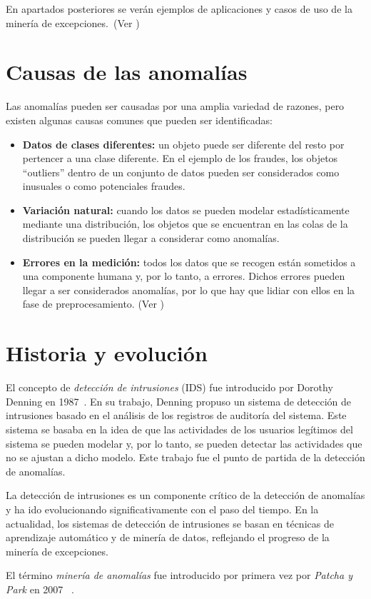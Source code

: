 En apartados posteriores se verán ejemplos de aplicaciones y casos de uso de la minería de
excepciones.~(Ver )

\section{Causas de las anomalías}
Las anomalías pueden ser causadas por una amplia variedad de razones, pero existen algunas
causas comunes que pueden ser identificadas:

\begin{itemize}
	\item \textbf{Datos de clases diferentes:} un objeto puede ser diferente del resto por
		pertencer a una clase diferente. En el ejemplo de los fraudes, los objetos ``outliers''
		dentro de un conjunto de datos pueden ser considerados como inusuales o como potenciales
		fraudes.
	\item \textbf{Variación natural:} cuando los datos se pueden modelar estadísticamente
		mediante una distribución, los objetos que se encuentran en las colas de la distribución
		se pueden llegar a considerar como anomalías.
	\item \textbf{Errores en la medición:} todos los datos que se recogen están sometidos a una
		componente humana y, por lo tanto, a errores. Dichos errores pueden llegar a ser
		considerados anomalías, por lo que hay que lidiar con ellos en la fase de preprocesamiento.
		(Ver )
\end{itemize}

\section{Historia y evolución}
El concepto de \textit{detección de intrusiones} (IDS) fue introducido por Dorothy Denning en
1987~\cite{denning1987intrusion}. En su trabajo, Denning propuso un sistema de detección de intrusiones
basado en el análisis de los registros de auditoría del sistema. Este sistema se basaba en la idea
de que las actividades de los usuarios legítimos del sistema se pueden modelar y, por lo tanto,
se pueden detectar las actividades que no se ajustan a dicho modelo. Este trabajo fue el punto de
partida de la detección de anomalías.

La detección de intrusiones es un componente crítico de la detección de anomalías y ha ido evolucionando
significativamente con el paso del tiempo. En la actualidad, los sistemas de detección de intrusiones
se basan en técnicas de aprendizaje automático y de minería de datos, reflejando el progreso de la minería
de excepciones.

El término \textit{minería de anomalías} fue introducido por primera vez por \textit{Patcha y Park} en 2007
~\cite{patcha2007overview}.
